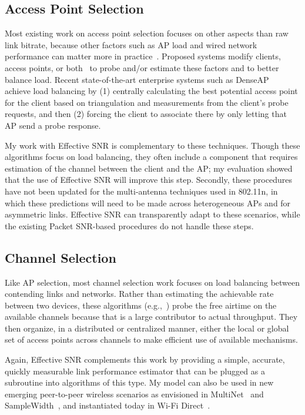 \subsection{Access Point Selection}
Most existing work on access point selection focuses on other aspects than raw link bitrate, because other factors such as AP load and wired network performance can matter more in practice~\cite{Balachandran_AP,Judd_AP}. Proposed systems modify clients, access points, or both~\cite{Balachandran_AP,Berjerano_AP,Nicholson_AP,Vasudevan_AP} to probe and/or estimate these factors and to better balance load. Recent state-of-the-art enterprise systems such as DenseAP~\cite{Murty_DenseAP} achieve load balancing by (1) centrally calculating the best potential access point for the client based on triangulation and measurements from the client's probe requests, and then (2) forcing the client to associate there by only letting that AP send a probe response.

My work with Effective SNR is complementary to these techniques. Though these algorithms focus on load balancing, they often include a component that requires estimation of the channel between the client and the AP; my evaluation showed that the use of Effective SNR will improve this step. Secondly, these procedures have not been updated for the multi-antenna techniques used in 802.11n, in which these predictions will need to be made across heterogeneous APs and for asymmetric links. Effective SNR can transparently adapt to these scenarios, while the existing Packet SNR-based procedures do not handle these steps.

\subsection{Channel Selection}
Like AP selection, most channel selection work focuses on load balancing between contending links and networks. Rather than estimating the achievable rate between two devices, these algorithms (e.g.,~\cite{Akella_Chan,Athanasiou_LAC,Kauffmann_Chan,Rozner_Chan}) probe the free airtime on the available channels because that is a large contributor to actual throughput. They then organize, in a distributed or centralized manner, either the local or global set of access points across channels to make efficient use of available mechanisms.

Again, Effective SNR complements this work by providing a simple, accurate, quickly measurable link performance estimator that can be plugged as a subroutine into algorithms of this type. My model can also be used in new emerging peer-to-peer wireless scenarios as envisioned in MultiNet~\cite{Chandra_MultiNet} and SampleWidth~\cite{Chandra_SampleWidth}, and instantiated today in Wi-Fi Direct~\cite{wifi_direct}.

